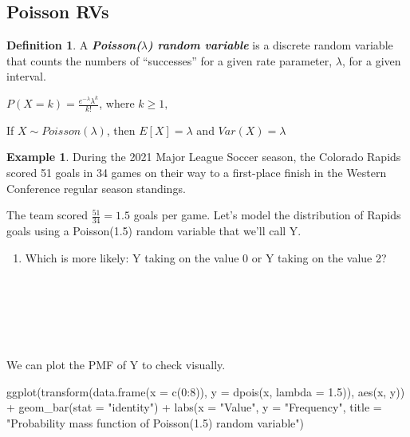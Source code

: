 \documentclass[
  11pt,
]{book}
\newenvironment{Shaded}{\begin{snugshade}}{\end{snugshade}}
\newcommand{\AttributeTok}[1]{\textcolor[rgb]{0.77,0.63,0.00}{#1}}
\newcommand{\DecValTok}[1]{\textcolor[rgb]{0.00,0.00,0.81}{#1}}
\newcommand{\FloatTok}[1]{\textcolor[rgb]{0.00,0.00,0.81}{#1}}
\newcommand{\FunctionTok}[1]{\textcolor[rgb]{0.00,0.00,0.00}{#1}}
\newcommand{\NormalTok}[1]{#1}
\newcommand{\SpecialCharTok}[1]{\textcolor[rgb]{0.00,0.00,0.00}{#1}}
\newcommand{\StringTok}[1]{\textcolor[rgb]{0.31,0.60,0.02}{#1}}
\providecommand{\tightlist}{%
  \setlength{\itemsep}{0pt}\setlength{\parskip}{0pt}}
\theoremstyle{definition}
\newtheorem{definition}{Definition}[chapter]
\theoremstyle{definition}
\newtheorem{example}{Example}[chapter]
\theoremstyle{definition}
\theoremstyle{definition}
\theoremstyle{remark}
\begin{document}
\hypertarget{poisson-rvs}{%
\subsection{Poisson RVs}\label{poisson-rvs}}

\begin{definition}
A \textbf{\emph{Poisson(\(\lambda\)) random variable}} is a discrete random variable that counts the numbers of ``successes'' for a given rate parameter, \(\lambda\), for a given interval.

\(P(X=k) = \frac{e^{-\lambda}\lambda^k}{k!}\), where \(k \geq 1,\)

If \(X \sim Poisson(\lambda)\), then \(E[X]=\lambda\) and \(Var(X)=\lambda\)
\end{definition}

\begin{example}
During the 2021 Major League Soccer season, the Colorado Rapids scored 51 goals in 34 games on their way to a first-place finish in the Western Conference regular season standings.

The team scored \(\frac{51}{34} = 1.5\) goals per game. Let's model the distribution of Rapids goals using a Poisson(1.5) random variable that we'll call Y.
\end{example}

\begin{enumerate}
\def\labelenumi{(\alph{enumi})}
\tightlist
\item
  Which is more likely: Y taking on the value 0 or Y taking on the value 2?\\
  \strut \\
  \strut \\
  \strut \\
\end{enumerate}

We can plot the PMF of Y to check visually.

\begin{Shaded}
\begin{Highlighting}[]
\FunctionTok{ggplot}\NormalTok{(}\FunctionTok{transform}\NormalTok{(}\FunctionTok{data.frame}\NormalTok{(}\AttributeTok{x =} \FunctionTok{c}\NormalTok{(}\DecValTok{0}\SpecialCharTok{:}\DecValTok{8}\NormalTok{)), }\AttributeTok{y =} \FunctionTok{dpois}\NormalTok{(x, }\AttributeTok{lambda =} \FloatTok{1.5}\NormalTok{)), }\FunctionTok{aes}\NormalTok{(x, y)) }\SpecialCharTok{+}
    \FunctionTok{geom\_bar}\NormalTok{(}\AttributeTok{stat =} \StringTok{"identity"}\NormalTok{) }\SpecialCharTok{+} \FunctionTok{labs}\NormalTok{(}\AttributeTok{x =} \StringTok{"Value"}\NormalTok{, }\AttributeTok{y =} \StringTok{"Frequency"}\NormalTok{, }\AttributeTok{title =} \StringTok{"Probability mass function of Poisson(1.5) random variable"}\NormalTok{)}
\end{Highlighting}
\end{Shaded}
\end{document}
